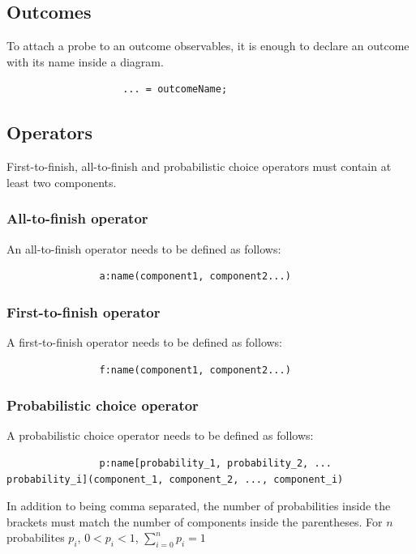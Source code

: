         \subsection{Outcomes}
            To attach a probe to an outcome observables, it is enough to declare an outcome with its name inside a diagram.
                \begin{verbatim}
                    ... = outcomeName;
                \end{verbatim}
        \subsection{Operators}
            First-to-finish, all-to-finish and probabilistic choice operators must contain at least two components.
              \subsubsection{All-to-finish operator}
            An all-to-finish operator needs to be defined as follows:
            \begin{verbatim}
                a:name(component1, component2...)
            \end{verbatim}

        \subsubsection{First-to-finish operator}
            A first-to-finish operator needs to be defined as follows:
            \begin{verbatim}
                f:name(component1, component2...)
            \end{verbatim} 

        \subsubsection{Probabilistic choice operator}
            A probabilistic choice operator needs to be defined as follows:
            \begin{verbatim}
                p:name[probability_1, probability_2, ... probability_i](component_1, component_2, ..., component_i) 
            \end{verbatim}
            In addition to being comma separated, the number of probabilities inside the brackets must match the number of components inside the parentheses. For $n$ probabilites $p_i$, $0 < p_i < 1$, $\sum_{i = 0}^{n} p_i = 1$ 
        
